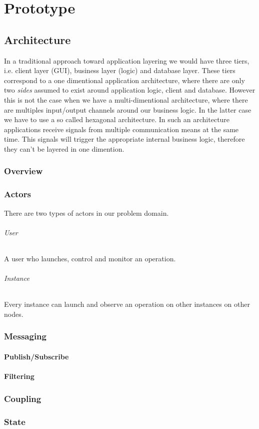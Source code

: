 \chapter{Prototype}
\label{cha:prototype}

\section{Architecture}
In a traditional approach toward application layering we would have three tiers, i.e. client layer (GUI),
business layer (logic) and database layer. These tiers correspond to a one dimentional application architecture,
where there are only two \textit{sides} assumed to exist around application logic, client and database. However
this is not the case when we have a multi-dimentional architecture, where there are multiples input/output channels
around our business logic. In the latter case we have to use a so called hexagonal architecture. \cite{alistair}
In such an architecture applications receive signals from multiple communication means at the same time. This 
signals will trigger the appropriate internal business logic, therefore they can't be layered in one dimention.
\subsection{Overview}

\subsection{Actors}
There are two types of actors in our problem domain.
\subparagraph{User}
A user who launches, control and monitor an operation.
\subparagraph{Instance}
Every instance can launch and observe an operation on other instances on other nodes.
\subsection{Messaging}
\subsubsection{Publish/Subscribe}
\subsubsection{Filtering}
\subsection{Coupling}
\subsection{State}

